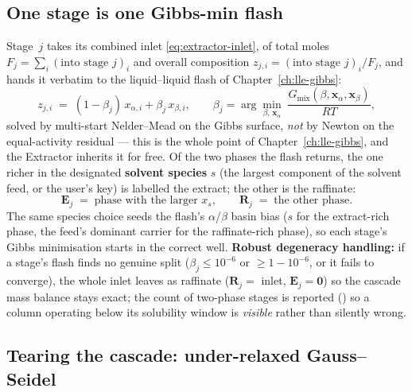 \documentclass[11pt,a4paper]{article}
\begin{document}
\subsection{One stage is one Gibbs-min flash}

Stage~$j$ takes its combined inlet \eqref{eq:extractor-inlet}, of total
moles $F_j = \sum_i (\text{into stage }j)_i$ and overall composition
$z_{j,i} = (\text{into stage }j)_i / F_j$, and hands it verbatim to the
liquid--liquid flash of Chapter~\ref{ch:lle-gibbs}:
\begin{equation}
   z_{j,i} \;=\; (1-\beta_j)\,x_{\alpha,i} + \beta_j\,x_{\beta,i},
   \qquad
   \beta_j = \arg\min_{\beta,\,\mathbf{x}_\alpha}\;
   \frac{G_{\mathrm{mix}}(\beta, \mathbf{x}_\alpha, \mathbf{x}_\beta)}{RT},
   \label{eq:extractor-stage}
\end{equation}
solved by multi-start Nelder--Mead on the Gibbs surface, \emph{not} by
Newton on the equal-activity residual --- this is the whole point of
Chapter~\ref{ch:lle-gibbs}, and the Extractor inherits it for free. Of
the two phases the flash returns, the one richer in the designated
\textbf{solvent species} $s$ (the largest component of the solvent feed,
or the user's  key) is labelled the extract; the other is
the raffinate:
\begin{equation}
   \mathbf{E}_j \;=\; \text{phase with the larger } x_{s},
   \qquad
   \mathbf{R}_j \;=\; \text{the other phase.}
\end{equation}
The same species choice seeds the flash's $\alpha$/$\beta$ basin bias
($s$ for the extract-rich phase, the feed's dominant carrier for the
raffinate-rich phase), so each stage's Gibbs minimisation starts in the
correct well. \textbf{Robust degeneracy handling:} if a stage's flash
finds no genuine split ($\beta_j \le 10^{-6}$ or $\ge 1-10^{-6}$, or it
fails to converge), the whole inlet leaves as raffinate
($\mathbf{R}_j = $ inlet, $\mathbf{E}_j = \mathbf 0$) so the cascade mass
balance stays exact; the count of two-phase stages is reported
() so a column operating below its solubility window is
\emph{visible} rather than silently wrong.

\subsection{Tearing the cascade: under-relaxed Gauss--Seidel}
\end{document}

